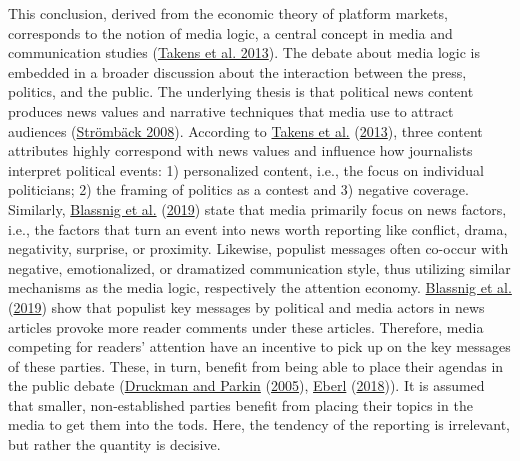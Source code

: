 \documentclass[
]{article}
\begin{document}
This conclusion, derived from the economic theory of platform markets,
corresponds to the notion of media logic, a central concept in media and
communication studies (\protect\hyperlink{ref-takens_media_2013}{Takens
et al. 2013}). The debate about media logic is embedded in a broader
discussion about the interaction between the press, politics, and the
public. The underlying thesis is that political news content produces
news values and narrative techniques that media use to attract audiences
(\protect\hyperlink{ref-stromback_four_2008}{Strömbäck 2008}). According
to \protect\hyperlink{ref-takens_media_2013}{Takens et al.}
(\protect\hyperlink{ref-takens_media_2013}{2013}), three content
attributes highly correspond with news values and influence how
journalists interpret political events: 1) personalized content, i.e.,
the focus on individual politicians; 2) the framing of politics as a
contest and 3) negative coverage. Similarly,
\protect\hyperlink{ref-blassnig_hitting_2019}{Blassnig et al.}
(\protect\hyperlink{ref-blassnig_hitting_2019}{2019}) state that media
primarily focus on news factors, i.e., the factors that turn an event
into news worth reporting like conflict, drama, negativity, surprise, or
proximity. Likewise, populist messages often co-occur with negative,
emotionalized, or dramatized communication style, thus utilizing similar
mechanisms as the media logic, respectively the attention economy.
\protect\hyperlink{ref-blassnig_hitting_2019}{Blassnig et al.}
(\protect\hyperlink{ref-blassnig_hitting_2019}{2019}) show that populist
key messages by political and media actors in news articles provoke more
reader comments under these articles. Therefore, media competing for
readers' attention have an incentive to pick up on the key messages of
these parties. These, in turn, benefit from being able to place their
agendas in the public debate
(\protect\hyperlink{ref-druckman_impact_2005}{Druckman and Parkin}
(\protect\hyperlink{ref-druckman_impact_2005}{2005}),
\protect\hyperlink{ref-eberl_lying_2018}{Eberl}
(\protect\hyperlink{ref-eberl_lying_2018}{2018})). It is assumed that
smaller, non-established parties benefit from placing their topics in
the media to get them into the tods. Here, the tendency of the reporting
is irrelevant, but rather the quantity is decisive.
\end{document}
